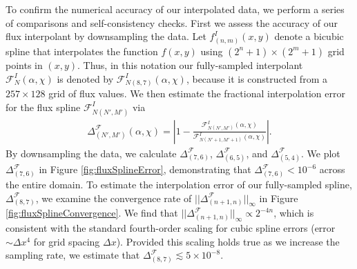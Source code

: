 \documentclass[%
 reprint,
 nofootinbib,
 amsmath,amssymb,
 aps,
 prd,
]{revtex4-2}
\begin{document}
To confirm the numerical accuracy of our interpolated data, we perform a series of comparisons and self-consistency checks. First we assess the accuracy of our flux interpolant by downsampling the data. Let $f^I_{(n,m)}(x,y)$ denote a bicubic spline that interpolates the function $f(x,y)$ using $(2^n+1) \times (2^m+1)$ grid points in $(x,y)$. Thus, in this notation our fully-sampled interpolant $\mathcal{F}_N^I(\alpha, \chi)$ is denoted by $\mathcal{F}_{N(8,7)}^I(\alpha, \chi)$, because it is constructed from a $257\times 128$ grid of flux values. We then estimate the fractional interpolation error for the flux spline $\mathcal{F}_{N(N',M')}^I$ via
\begin{align}
    \Delta^\mathcal{F}_{(N',M')}(\alpha, \chi) = \left|1 - \frac{\mathcal{F}_{N(N',M')}^I(\alpha, \chi)}{\mathcal{F}_{N(N'+1,M'+1)}^I(\alpha, \chi)} \right|.
\end{align}
By downsampling the data, we calculate $\Delta^\mathcal{F}_{(7,6)}$, $\Delta^\mathcal{F}_{(6,5)}$, and $\Delta^\mathcal{F}_{(5,4)}$. We plot $\Delta^\mathcal{F}_{(7,6)}$ in Figure \ref{fig:fluxSplineError}, demonstrating that $\Delta^\mathcal{F}_{(7,6)}<10^{-6}$ across the entire domain. To estimate the interpolation error of our fully-sampled spline, $\Delta^\mathcal{F}_{(8,7)}$, we examine the convergence rate of $|| \Delta^\mathcal{F}_{(n+1,n)} ||_\infty$ in Figure \ref{fig:fluxSplineConvergence}. We find that $|| \Delta^\mathcal{F}_{(n+1,n)} ||_\infty \propto 2^{-4n}$, which is consistent with the standard fourth-order scaling for cubic spline errors (error $ \sim \Delta x^4$ for grid spacing $\Delta x$). Provided this scaling holds true as we increase the sampling rate, we estimate that $\Delta^\mathcal{F}_{(8,7)} \lesssim 5\times 10^{-8}$.
\end{document}
